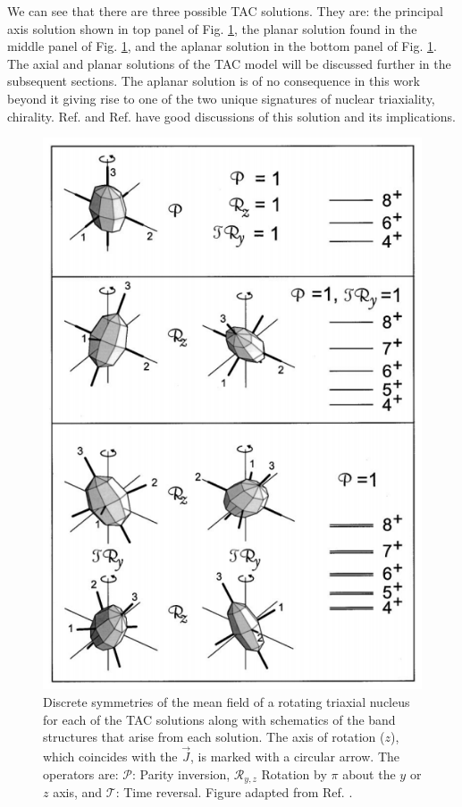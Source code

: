 We can see that there are three possible TAC solutions. They are: the principal axis solution shown in top panel of Fig. \ref{fig:chp2-TAC-solution-types}, the planar solution found in the middle panel of Fig. \ref{fig:chp2-TAC-solution-types}, and the aplanar solution in the bottom panel of Fig. \ref{fig:chp2-TAC-solution-types}. The axial and planar solutions of the TAC model will be discussed further in the subsequent sections. The aplanar solution is of no consequence in this work beyond it giving rise to one of the two unique signatures of nuclear triaxiality, chirality. Ref. \cite{frauendorfTAC} and Ref. \cite{frauendorfChirality} have good discussions of this solution and its implications.
\begin{figure}[t!]
\centerline{\includegraphics[height=0.6\textheight]{./img/c2/tacsolutions.png}}
	\caption{Discrete symmetries of the mean field of a rotating triaxial nucleus for each of the TAC solutions along with schematics of the band structures that arise from each solution. The axis of rotation ($z$), which coincides with the $\vec{J}$, is marked with a circular arrow. The operators are: $\mathscr{P}$: Parity inversion, $\mathscr{R}_{y,z}$ Rotation by $\pi$ about the $y$ or $z$ axis, and $\mathscr{T}$: Time reversal. Figure adapted from Ref. \cite{frauendorfTAC}.\label{fig:chp2-TAC-solution-types}}
\end{figure}

